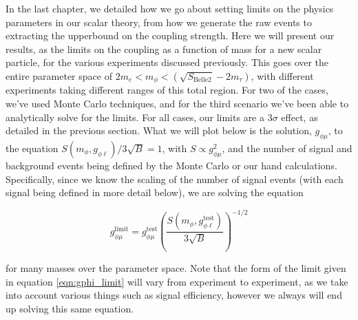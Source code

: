 \label{chapter:results}

In the last chapter, we detailed how we go about setting limits on the physics parameters in our scalar theory, from how we generate the raw events to extracting the upperbound on the coupling strength.
Here we will present our results, as the limits on the coupling as a function of mass for a new scalar particle, for the various experiments discussed previously.
This goes over the entire parameter space of $2m_e < m_\phi < (\sqrt{S_\textrm{Belle2}} - 2m_\tau)$, with different experiments taking different ranges of this total region.
For two of the cases, we've used \madgraph Monte Carlo techniques, and for the third scenario we've been able to analytically solve for the limits.
For all cases, our limits are a $3\sigma$ effect, as detailed in the previous section.
What we will plot below is the solution, $g_{\phi\mu}$, to the equation $S(m_\phi,g_{\phi\ell})/3\sqrt{B} = 1$, with $S \propto g_{\phi\mu}^2$, and the number of signal and background events being defined by the Monte Carlo or our hand calculations.
Specifically, since we know the scaling of the number of signal events (with each signal being defined in more detail below), we are solving the equation

\begin{equation}
\label{eqn:gphi_limit}
g_{\phi\mu}^\textrm{limit} = g_{\phi\mu}^\textrm{test} \left( \frac{S(m_\phi,g_{\phi\ell}^\textrm{test})}{3\sqrt{B}} \right)^{-1/2}
\end{equation}

\noindent for many masses over the parameter space.
Note that the form of the limit given in equation \ref{eqn:gphi_limit} will vary from experiment to experiment, as we take into account various things such as signal efficiency, however we always will end up solving this same equation.




